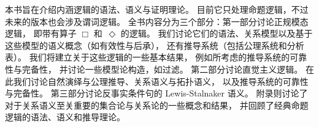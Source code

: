 本书旨在介绍内涵逻辑的语法、语义与证明理论。
目前它只处理命题逻辑，不过未来的版本也会涉及谓词逻辑。
全书内容分为三个部分：第一部分讨论正规模态逻辑，
即带有算子 $\Box$ 和~$\Diamond$ 的逻辑。
我们讨论它们的语法、关系模型以及基于这些模型的语义概念（如有效性与后承），
还有推导系统（包括公理系统和分析表）。
我们将建立关于这些逻辑的一些基本结果，
例如所考虑的推导系统的可靠性与完备性，
并讨论一些模型论构造，如过滤。
第二部分讨论直觉主义逻辑。
在此我们讨论自然演绎与公理推导、关系语义与拓扑语义，
以及推导系统的可靠性与完备性。
第三部分讨论反事实条件句的 Lewis-Stalnaker 语义。
附录则讨论了对于关系语义至关重要的集合论与关系论的一些概念和结果，
并回顾了经典命题逻辑的语法、语义和推导理论。